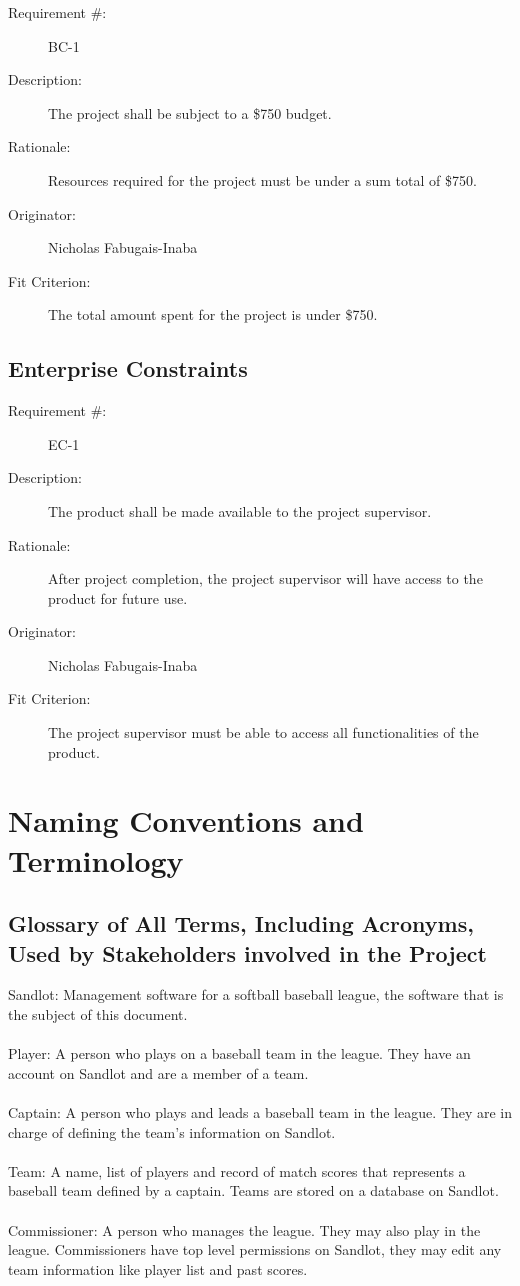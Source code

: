 \documentclass[12pt]{article}
\newenvironment{myreq}[1]{%
\setlist[description]{font=\normalfont\color{darkgray}}%
\begin{tcolorbox}[colframe=black,colback=white, sharp corners, boxrule=1pt]%
\bfseries\color{blue}%
\begin{description}#1}%
{\end{description}\end{tcolorbox}}
\newcommand{\twoinline}[2]{\begin{multicols}{2}#1 #2\end{multicols}}
\newcommand{\reqno}{\item[Requirement \#:]}
\newcommand{\reqdesc}{\item[Description:]}
\newcommand{\reqrat}{\item[Rationale:]}
\newcommand{\reqorig}{\item[Originator:]}
\newcommand{\reqfit}{\item[Fit Criterion:]}
\newcommand{\reqsatis}{\item[Customer Satisfaction:]}
\newcommand{\reqdissat}{\item[Customer Dissatisfaction:]}
\begin{document}
\begin{myreq}
  \reqno BC-1
  \reqdesc The project shall be subject to a \$750 budget.
  \reqrat Resources required for the project must be under a sum total of
  \$750.
  \reqorig Nicholas Fabugais-Inaba
  \reqfit The total amount spent for the project is under \$750.
  \twoinline
    {\reqsatis 1}
    {\reqdissat 1}
\end{myreq}

\subsection{Enterprise Constraints}

\begin{myreq}
  \reqno EC-1
  \reqdesc The product shall be made available to the project supervisor.
  \reqrat After project completion, the project supervisor will have
  access to the product for future use. 
  \reqorig Nicholas Fabugais-Inaba
  \reqfit The project supervisor must be able to access all functionalities
  of the product.
  \twoinline
    {\reqsatis 5}
    {\reqdissat 5}
\end{myreq}

\section{Naming Conventions and Terminology}
\subsection{Glossary of All Terms, Including Acronyms, Used by Stakeholders
involved in the Project}
Sandlot: Management software for a softball baseball league, the software that
is the subject of this document.\\\\
Player: A person who plays on a baseball team in the league. They have an
account on Sandlot and are a member of a team.\\\\
Captain: A person who plays and leads a baseball team in the league. They are
in charge of defining the team's information on Sandlot.\\\\
Team: A name, list of players and record of match scores that represents a
baseball team defined by a captain. Teams are stored on a database on Sandlot.
\\\\
Commissioner: A person who manages the league. They may also play in the
league. Commissioners have top level permissions on Sandlot, they may edit any
team information like player list and past scores.\\\\
\end{document}
